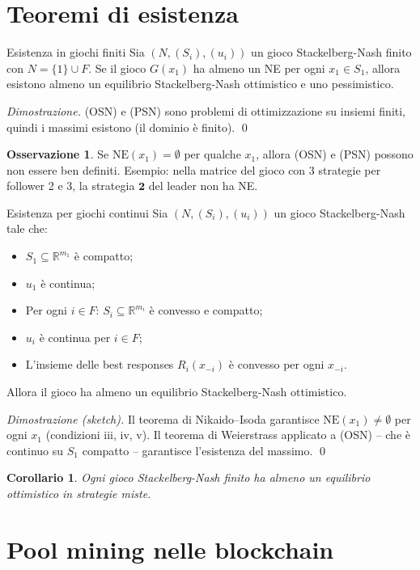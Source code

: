 \documentclass[12pt,a4paper,twoside]{book}
\theoremstyle{plain}
\newtheorem{corollary}[theorem]{Corollario}
\theoremstyle{definition}
\newtheorem{remark}[theorem]{Osservazione}
\newcommand{\NE}{\mathrm{NE}}
\begin{document}
\section{Teoremi di esistenza}

\begin{thmbox}{Esistenza in giochi finiti}
Sia $(N,(S_i),(u_i))$ un gioco Stackelberg-Nash finito con $N=\{1\}\cup F$. Se il gioco $G(x_1)$ ha almeno un NE per ogni $x_1\in S_1$, allora esistono almeno un equilibrio Stackelberg-Nash ottimistico e uno pessimistico.
\end{thmbox}
\textit{Dimostrazione.} (OSN) e (PSN) sono problemi di ottimizzazione su insiemi finiti, quindi i massimi esistono (il dominio è finito). \qed

\begin{remark}
Se $\NE(x_1)=\emptyset$ per qualche $x_1$, allora (OSN) e (PSN) possono non essere ben definiti. Esempio: nella matrice del gioco con 3 strategie per follower 2 e 3, la strategia $\mathbf{2}$ del leader non ha NE.
\end{remark}

\begin{thmbox}{Esistenza per giochi continui}
Sia $(N,(S_i),(u_i))$ un gioco Stackelberg-Nash tale che:
\begin{itemize}
  \item[(i)] $S_1\subseteq\mathbb{R}^{m_1}$ è compatto;
  \item[(ii)] $u_1$ è continua;
  \item[(iii)] Per ogni $i\in F$: $S_i\subseteq\mathbb{R}^{m_i}$ è convesso e compatto;
  \item[(iv)] $u_i$ è continua per $i\in F$;
  \item[(v)] L'insieme delle best responses $R_i(x_{-i})$ è convesso per ogni $x_{-i}$.
\end{itemize}
Allora il gioco ha almeno un equilibrio Stackelberg-Nash ottimistico.
\end{thmbox}
\textit{Dimostrazione (sketch).} Il teorema di Nikaido--Isoda garantisce $\NE(x_1)\ne\emptyset$ per ogni $x_1$ (condizioni iii, iv, v). Il teorema di Weierstrass applicato a (OSN) -- che è continuo su $S_1$ compatto -- garantisce l'esistenza del massimo. \qed

\begin{corollary}
Ogni gioco Stackelberg-Nash finito ha almeno un equilibrio ottimistico in strategie miste.
\end{corollary}

\section{Pool mining nelle blockchain}
\end{document}
